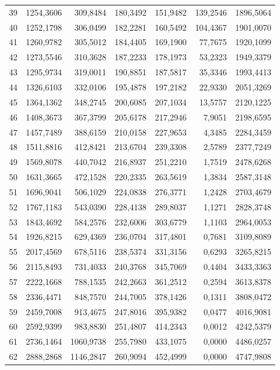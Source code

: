 \begin{small}
\begin{longtable}{rrrrrrr}
39 & 1254,3606 & 309,8484 & 180,3492 & 151,9482 & 139,2546 & 1896,5064 \\
40 & 1252,1798 & 306,0499 & 182,2281 & 160,5492 & 104,4367 & 1901,0070 \\
41 & 1260,9782 & 305,5012 & 184,4405 & 169,1900 & 77,7675 & 1920,1099 \\
42 & 1273,5546 & 310,3628 & 187,2233 & 178,1973 & 53,2323 & 1949,3379 \\
43 & 1295,9734 & 319,0011 & 190,8851 & 187,5817 & 35,3346 & 1993,4413 \\
44 & 1326,6103 & 332,0106 & 195,4878 & 197,2182 & 22,9330 & 2051,3269 \\
45 & 1364,1362 & 348,2745 & 200,6085 & 207,1034 & 13,5757 & 2120,1225 \\
46 & 1408,3673 & 367,3799 & 205,6178 & 217,2946 & 7,9051 & 2198,6595 \\
47 & 1457,7489 & 388,6159 & 210,0158 & 227,9653 & 4,3485 & 2284,3459 \\
48 & 1511,8816 & 412,8421 & 213,6704 & 239,3308 & 2,5789 & 2377,7249 \\
49 & 1569,8078 & 440,7042 & 216,8937 & 251,2210 & 1,7519 & 2478,6268 \\
50 & 1631,3665 & 472,1528 & 220,2335 & 263,5619 & 1,3834 & 2587,3148 \\
51 & 1696,9041 & 506,1029 & 224,0838 & 276,3771 & 1,2428 & 2703,4679 \\
52 & 1767,1183 & 543,0390 & 228,4138 & 289,8037 & 1,1271 & 2828,3748 \\
53 & 1843,4692 & 584,2576 & 232,6006 & 303,6779 & 1,1103 & 2964,0053 \\
54 & 1926,8215 & 629,4369 & 236,0704 & 317,4801 & 0,7681 & 3109,8089 \\
55 & 2017,4569 & 678,5116 & 238,5374 & 331,3156 & 0,6293 & 3265,8215 \\
56 & 2115,8493 & 731,4033 & 240,3768 & 345,7069 & 0,4404 & 3433,3363 \\
57 & 2222,1668 & 788,1535 & 242,2663 & 361,2512 & 0,2594 & 3613,8378 \\
58 & 2336,4471 & 848,7570 & 244,7005 & 378,1426 & 0,1311 & 3808,0472 \\
59 & 2459,7008 & 913,4675 & 247,8016 & 395,9382 & 0,0477 & 4016,9081 \\
60 & 2592,9399 & 983,8830 & 251,4807 & 414,2343 & 0,0012 & 4242,5379 \\
61 & 2736,1464 & 1060,9738 & 255,7980 & 433,1075 & 0,0000 & 4486,0257 \\
62 & 2888,2868 & 1146,2847 & 260,9094 & 452,4999 & 0,0000 & 4747,9808 \\

\end{longtable}
\end{small}
